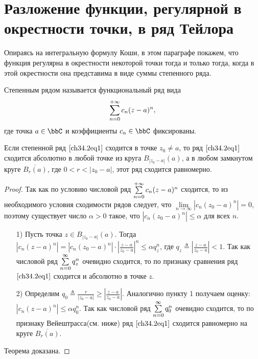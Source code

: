 \section{Разложение функции, регулярной в окрестности точки, в ряд Тейлора}

Опираясь на интегральную формулу Коши, в этом параграфе покажем, что функция регулярна в окрестности некоторой точки тогда и только тогда, когда в этой окрестности она представима в виде суммы степенного ряда.

\begin{defn}
$\textit{Степенным рядом}$ называется функциональный ряд вида
\begin{equation} \label{ch34.2eq1}
\sum_{n = 0}^{+\infty}\limits c_n (z - a)^n,
\end{equation}
где точка $a \in \bbC$ и коэффициенты $c_n \in \bbC$ фиксированы.
\end{defn}

\begin{thm} \label{ch34.2Thm1}
Если степенной ряд $\eqref{ch34.2eq1}$ сходится в точке $z_0 \not= a$, то ряд $\eqref{ch34.2eq1}$ сходится абсолютно в любой точке из круга $B_{|z_0 - a|}(a)$, а в любом замкнутом круге $\overline{B_{r}(a)}$, где $0 < r < |z_0 - a|$, этот ряд сходится равномерно.
\end{thm}
\begin{proof}
Так как по условию числовой ряд $\sum_{n = 0}^{+\infty}\limits c_n (z - a)^n$ сходится, то из необходимого условия сходимости рядов следует, что $\lim\limits_{n \to \infty} |c_n(z_0 - a)^n| = 0$, поэтому существует число $\alpha > 0$ такое, что $|c_n(z_0 - a)^n| \le \alpha$ для всех $n$.
\begin{enumerate}
\item[1)] {\rightskip=3.5cm} { Пусть точка $z \in B_{|z_0 - a|}(a)$. Тогда $|c_n(z - a)^n| = |c_n(z_0 - a)^n| \cdot \left| \frac{z - a}{z_0 - a} \right|^n \le \alpha q^{n}_z$, где $q_z \triangleq \left| \frac{z - a}{z_0 - a} \right| < 1$. Так как числовой ряд $\sum_{n = 0}^{\infty}\limits q_{z}^n$ очевидно сходится, то по признаку сравнения ряд $\eqref{ch34.2eq1}$ сходится и абсолютно в точке $z$.
}
\item[2)] {\rightskip=0cm}Определим $q_0 \triangleq \frac{r}{|z_0 - a|}\ge\left|\frac{z - a}{z_0 - a}\right|$. Аналогично пункту 1 получаем оценку: $|c_n(z - a)^n| \le \alpha q^{n}_0$. Так как числовой ряд $\sum_{n = 0}^{\infty}\limits q_{0}^n$ очевидно сходится, то по признаку Вейештрасса(см. ниже) ряд $\eqref{ch34.2eq1}$ сходится равномерно на круге $\overline{B_{r}(a)}$.
\end{enumerate}
{\rightskip=-3.3cm} Теорема доказана.
\end{proof}

